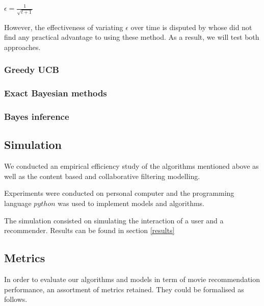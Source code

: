 \documentclass[letterpaper]{article}
\begin{document}
\begin{center}
	$\epsilon = \frac{1}{\sqrt{t+1}}$
\end{center}

However, the effectiveness of variating $\epsilon$ over time is disputed by \cite{vermorel2005multi} whose did not find any practical advantage to using these method. As a result, we will test both approaches.

\subsubsection{Greedy UCB}


\subsubsection{Exact Bayesian methods}


\subsubsection{Bayes inference}


\subsection{Simulation}

We conducted an empirical efficiency study of the algorithms mentioned above as well as the content based and collaborative filtering modelling. 

Experiments were conducted on personal computer and the programming language $python$ was used to implement models and algorithms.

The simulation consisted on simulating the interaction of a user and a recommender. Results can be found in section \ref{results} 

\subsection{Metrics}

In order to evaluate our algorithms and models in term of movie recommendation performance, an assortment of metrics retained. They could be formalised as follows.
\end{document}
